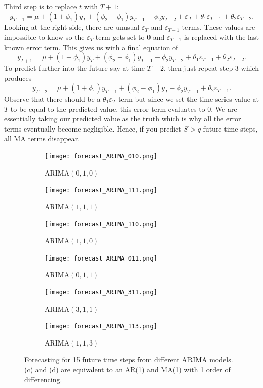 \documentclass{article}
\begin{document}
  Third step is to replace $t$ with $T+1$:
  \begin{equation*}
    y_{T+1} = \mu + (1 + \phi_1)y_{T} + (\phi_2 - \phi_1)y_{T-1} - \phi_2y_{T-2} + \varepsilon_{T} + \theta_1\varepsilon_{T-1} + \theta_2\varepsilon_{T-2}.
  \end{equation*}
  Looking at the right side, there are unusual $\varepsilon_T$ and $\varepsilon_{T-1}$ terms. These values are impossible to know so the $\varepsilon_T$ term gets set to 0 and $\varepsilon_{T-1}$ is replaced with the last known error term. This gives us with a final equation of 
  \begin{equation*}
    y_{T+1} = \mu + (1 + \phi_1)y_{T} + (\phi_2 - \phi_1)y_{T-1} - \phi_2y_{T-2} + \theta_1\varepsilon_{T-1} + \theta_2\varepsilon_{T-2}.
  \end{equation*}
  To predict further into the future say at time $T+2$, then just repeat step 3 which produces
  \begin{equation*}
    y_{T+2} = \mu + (1 + \phi_1)y_{T+1} + (\phi_2 - \phi_1)y_{T} - \phi_2y_{T-1} + \theta_2\varepsilon_{T-1}.
  \end{equation*}
  Observe that there should be a $\theta_1\varepsilon_{T}$ term but since we set the time series value at $T$ to be equal to the predicted value, this error term evaluates to 0. We are essentially taking our predicted value as the truth which is why all the error terms eventually become negligible. Hence, if you predict $S > q$ future time steps, all MA terms disappear. 

  \begin{figure}[H]
    \centering
    \captionsetup{justification=centering}
    \begin{subfigure}[b]{0.49\linewidth}
      \texttt{[image: forecast\_ARIMA\_010.png]}
      \caption{ARIMA$(0, 1, 0)$}
    \end{subfigure}
    \begin{subfigure}[b]{0.49\linewidth}
      \texttt{[image: forecast\_ARIMA\_111.png]}
      \caption{ARIMA$(1, 1, 1)$}
    \end{subfigure}
    \begin{subfigure}[b]{0.49\linewidth}
      \texttt{[image: forecast\_ARIMA\_110.png]}
      \caption{ARIMA$(1, 1, 0)$}
    \end{subfigure}
    \begin{subfigure}[b]{0.49\linewidth}
      \texttt{[image: forecast\_ARIMA\_011.png]}
      \caption{ARIMA$(0, 1, 1)$}
    \end{subfigure}
    \begin{subfigure}[b]{0.49\linewidth}
      \texttt{[image: forecast\_ARIMA\_311.png]}
      \caption{ARIMA$(3, 1, 1)$}
    \end{subfigure}
    \begin{subfigure}[b]{0.49\linewidth}
      \texttt{[image: forecast\_ARIMA\_113.png]}
      \caption{ARIMA$(1, 1, 3)$}
    \end{subfigure}
    \caption{Forecasting for 15 future time steps from different ARIMA models. (c) and (d) are equivalent to an AR(1) and MA(1) with 1 order of differencing.}
  \end{figure}
\end{document}
